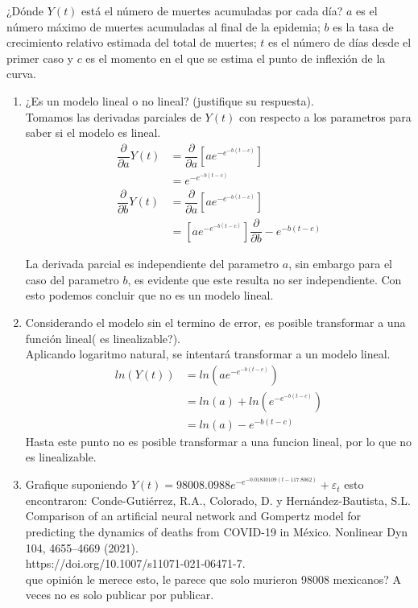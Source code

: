 \documentclass[12pt,a4paper]{report}
\begin{document}
\begin{enumerate}
¿Dónde $Y (t)$ está el número de muertes acumuladas por cada día? $a$ es el número máximo de muertes
acumuladas al final de la epidemia; $b$ es la tasa de crecimiento relativo estimada del total de muertes; $t$ es el número de días desde el primer caso y $c$ es el momento en el que se estima el punto de inflexión de la curva.\\

\begin{enumerate}
\item ¿Es un modelo lineal o no lineal? (justifique su respuesta).\\

Tomamos las derivadas parciales de $Y(t)$ con respecto a los parametros para saber si el modelo es lineal.\\

\begin{align*}
\dfrac{\partial}{\partial a}Y(t)&=\dfrac{\partial}{\partial a}\left[ae^{-e^{-b(t-c)}}\right]\\
&=e^{-e^{-b(t-c)}}\\
\dfrac{\partial}{\partial b}Y(t)&=\dfrac{\partial}{\partial a}\left[ae^{-e^{-b(t-c)}}\right]\\
&=\left[ae^{-e^{-b(t-c)}}\right]\dfrac{\partial}{\partial b}-e^{-b(t-c)}
\end{align*}

La derivada parcial es independiente del parametro $a$, sin embargo para el caso del parametro $b$, es evidente que este resulta no ser independiente. Con esto podemos concluir que no es un modelo lineal.


\item Considerando el modelo sin el termino de error, es posible transformar a una función lineal( es
linealizable?).\\

Aplicando logaritmo natural, se intentará transformar a un modelo lineal.\\


\begin{align*}
ln(Y(t))&=ln\left( ae^{-e^{-b(t-c)}}\right)\\
&=ln(a)+ ln\left(e^{-e^{-b(t-c)}}\right)\\
&=ln(a)-e^{-b(t-c)}
\end{align*}
Hasta este punto no es posible transformar a una funcion lineal, por lo que no es linealizable.

\item Grafique suponiendo $Y (t) = 98008.0988e^{-e^{-0.01830109(t-117.8062)}}+\varepsilon_{t} $ esto encontraron: Conde-Gutiérrez, R.A., Colorado, D. y Hernández-Bautista, S.L. Comparison of an artificial neural network and Gompertz model for predicting the dynamics of deaths from COVID-19 in México. Nonlinear Dyn 104, 4655–4669 (2021).\\
https://doi.org/10.1007/s11071-021-06471-7.\\
que opinión le merece esto, le parece que solo murieron 98008 mexicanos? A veces no es solo publicar por publicar.


\end{enumerate}
\end{enumerate}
\end{document}

